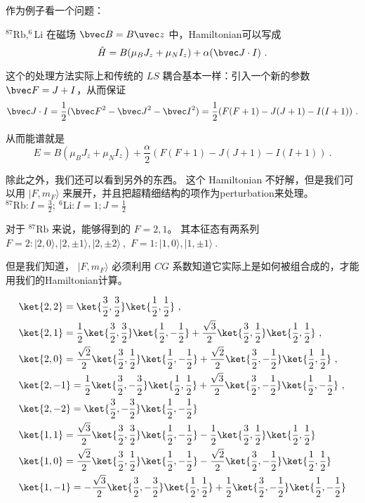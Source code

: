 作为例子看一个问题：

$^{87}{\text{Rb}}, ^6{\text{Li}}$ 在磁场 $\bvec B = B\uvec z$ 中，Hamiltonian可以写成
\begin{equation}
\hat{H} = B(\mu_B J_z+\mu_N I_z)+\alpha({\bvec J\cdot I})~.
\end{equation}

这个的处理方法实际上和传统的 $LS$ 耦合基本一样：引入一个新的参数 ${\bvec F = J+I}$，从而保证
\begin{equation}
{\bvec J\cdot I} = \frac{1}{2}({\bvec F}^2 - {\bvec J}^2 - {\bvec I}^2) = \frac{1}{2} (F(F+1) - J(J+1) - I(I+1))~.
\end{equation}

从而能谱就是
\begin{equation}
E = B(\mu_B J_z+\mu_N I_z)+\frac{\alpha}{2} (F(F+1) - J(J+1) - I(I+1))~.
\end{equation}

除此之外，我们还可以看到另外的东西。 这个 Hamiltonian 不好解，但是我们可以用 $|F,m_F\rangle$ 来展开，并且把超精细结构的项作为perturbation来处理。 $^{87}{\text{Rb}}: I = \frac{3}{2};\ ^6{\text{Li}}: I = 1; J = \frac{1}{2}$

对于 $^{87}{\text{Rb}}$ 来说，能够得到的 $F=2,1$。 其本征态有两系列
$F=2:|2,0\rangle,|2,\pm1\rangle,|2,\pm2\rangle~,$
$F=1:|1,0\rangle,|1,\pm1\rangle~.$

但是我们知道， $|F,m_F\rangle$ 必须利用 $CG$ 系数知道它实际上是如何被组合成的，才能用我们的Hamiltonian计算。

\begin{align}
&\ket{2,2} = \ket{\frac{3}{2},\frac{3}{2}} \ket{\frac{1}{2},\frac{1}{2}}~,\\
&\ket{2,1} = \frac{1}{2} \ket{\frac{3}{2},\frac{3}{2}} \ket{\frac{1}{2},-\frac{1}{2}} + \frac{\sqrt{3}}{2} \ket{\frac{3}{2},\frac{1}{2}} \ket{\frac{1}{2},\frac{1}{2}}~,\\
& \ket{2,0} = \frac{\sqrt{2}}{2} \ket{\frac{3}{2},\frac{1}{2}} \ket{\frac{1}{2},-\frac{1}{2}} + \frac{\sqrt{2}}{2} \ket{\frac{3}{2},-\frac{1}{2}} \ket{\frac{1}{2},\frac{1}{2}}~,\\
&\ket{2,-1} = \frac{1}{2} \ket{\frac{3}{2},-\frac{3}{2}} \ket{\frac{1}{2},\frac{1}{2}} + \frac{\sqrt{3}}{2} \ket{\frac{3}{2},-\frac{1}{2}} \ket{\frac{1}{2},-\frac{1}{2}}~,\\
& \ket{2,-2} = \ket{\frac{3}{2},-\frac{3}{2}} \ket{\frac{1}{2},-\frac{1}{2}}\\
&\ket{1,1} = \frac{\sqrt{3}}{2} \ket{\frac{3}{2},\frac{3}{2}} \ket{\frac{1}{2},-\frac{1}{2}} - \frac{1}{2} \ket{\frac{3}{2},\frac{1}{2}} \ket{\frac{1}{2},\frac{1}{2}}\\
&\ket{1,0} = \frac{\sqrt{2}}{2} \ket{\frac{3}{2},\frac{1}{2}} \ket{\frac{1}{2},-\frac{1}{2}} - \frac{\sqrt{2}}{2} \ket{\frac{3}{2},-\frac{1}{2}} \ket{\frac{1}{2},\frac{1}{2}}\\
&\ket{1,-1} = -\frac{\sqrt{3}}{2} \ket{\frac{3}{2},-\frac{3}{2}} \ket{\frac{1}{2},\frac{1}{2}} + \frac{1}{2} \ket{\frac{3}{2},-\frac{1}{2}} \ket{\frac{1}{2},-\frac{1}{2}}
\end{align}

